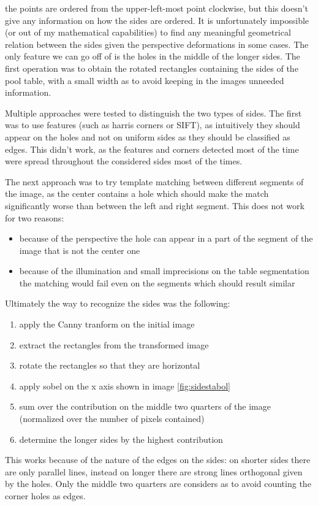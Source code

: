 the points are ordered from the upper-left-most point clockwise, but this doesn't give
any information on how the sides are ordered. It is unfortunately impossible (or out of my
mathematical capabilities) to find any meaningful geometrical relation between the sides
given the perspective deformations in some cases. The only feature we can go off of is the 
holes in the middle of the longer sides. The first operation was to obtain the rotated
rectangles containing the sides of the pool table, with a small width as to avoid 
keeping in the images unneeded information.\par 
Multiple approaches were tested to distinguish the two types of sides. The first was 
to use features (such as harris corners or SIFT), as intuitively they should appear 
on the holes and not on uniform sides as they should be classified as edges. This didn't
work, as the features and corners detected most of the time were spread throughout the 
considered sides most of the times.\par
The next approach was to try template matching between different segments of the image,
as the center contains a hole which should make the match significantly worse than
between the left and right segment. This does not work for two reasons:
\begin{itemize}
    \item because of the perspective the hole can appear in a part of the segment of the image that is not the center one
    \item because of the illumination and small imprecisions on the table segmentation the matching would fail even on the segments which should result similar
\end{itemize}
\par
Ultimately the way to recognize the sides was the following:
\begin{enumerate}
    \item apply the Canny tranform on the initial image
    \item extract the rectangles from the transformed image
    \item rotate the rectangles so that they are horizontal
    \item apply sobel on the x axis shown in image \ref{fig:sidestabol}
    \item sum over the contribution on the middle two quarters of the image (normalized over the number of pixels contained)
    \item determine the longer sides by the highest contribution
\end{enumerate}
This works because of the nature of the edges on the sides: on shorter sides there
are only parallel lines, instead on longer there are strong lines orthogonal given by the holes.
Only the middle two quarters are considers as to avoid counting the corner holes as edges.

